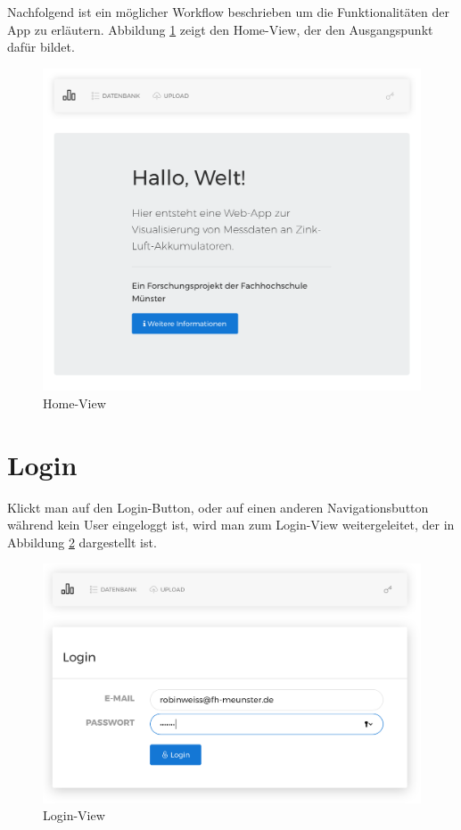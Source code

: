 Nachfolgend ist ein möglicher Workflow beschrieben um die Funktionalitäten der App zu erläutern. Abbildung \ref{fig:home} zeigt den Home-View, der den Ausgangspunkt dafür bildet.

\begin{figure}
\centering
\includegraphics[width=\textwidth]{Figures/home}
\caption{Home-View}
\label{fig:home}
\end{figure}

\section{Login}

Klickt man auf den Login-Button, oder auf einen anderen Navigationsbutton während kein User eingeloggt ist, wird man zum Login-View weitergeleitet, der in Abbildung \ref{fig:login} dargestellt ist.

\begin{figure}
\centering
\includegraphics[width=\textwidth]{Figures/login}
\caption{Login-View}
\label{fig:login}
\end{figure}

